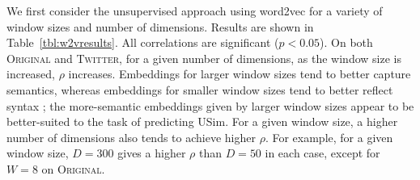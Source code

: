 \documentclass[11pt]{article}
\newcommand\original{\textsc{Original}\xspace}
\newcommand\twitter{\textsc{Twitter}\xspace}
\newcommand\glove{GloVe\xspace}
\newcommand{\tabref}[1]{Table~\ref{#1}}
\begin{document}




We first consider the unsupervised approach using word2vec for a
variety of window sizes and number of dimensions. Results are shown in
\tabref{tbl:w2vresults}. All correlations are significant
($p<0.05$). On both \original and \twitter, for a given number of
dimensions, as the window size is increased, $\rho$
increases. Embeddings for larger window sizes tend to better capture
semantics, whereas embeddings for smaller window sizes tend to better
reflect syntax \citep{levy2014dependency}; the more-semantic
embeddings given by larger window sizes appear to be better-suited to
the task of predicting USim. For a given window size, a higher number
of dimensions also tends to achieve higher $\rho$. For example, for a
given window size, $D=300$ gives a higher $\rho$ than $D=50$ in each
case, except for $W=8$ on \original.
\end{document}
